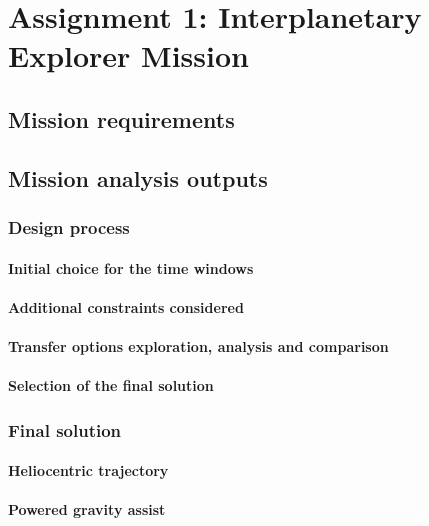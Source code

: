 \documentclass[11pt,a4paper]{report}
\begin{document}
\part{Assignment 1: Interplanetary Explorer Mission}
\chapter{Mission requirements}
\chapter{Mission analysis outputs}
\section{Design process}
\subsection{Initial choice for the time windows}
\subsection{Additional constraints considered}
\subsection{Transfer options exploration, analysis and comparison}
\subsection{Selection of the final solution}
\section{Final solution}
\subsection{Heliocentric trajectory}
\subsection{Powered gravity assist}
\end{document}
